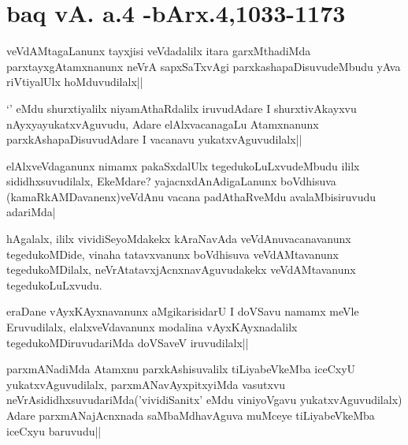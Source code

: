 \section*{baq vA. a.4 -bArx.4,1033-1173}


\begin{artha}
veVdAMtagaLanunx tayxjisi veVdadalilx itara garxMthadiMda parxtayxgAtamxnanunx neVrA 
sapxSaTxvAgi parxkashapaDisuvudeMbudu yAva riVtiyalUlx hoMduvudilalx||
\end{artha}

\begin{artha}
`\stext' eMdu shurxtiyalilx niyamAthaRdalilx iruvudAdare I shurxtivAkayxvu 
nAyxyayukatxvAguvudu, Adare elAlxvacanagaLu Atamxnanunx parxkAshapaDisuvudAdare I vacanavu 
yukatxvAguvudilalx||
\end{artha}


\begin{artha}
elAlxveVdaganunx nimamx pakaSxdalUlx tegedukoLuLxvudeMbudu ililx sididhxsuvudilalx, 
EkeMdare? yajacnxdAnAdigaLanunx boVdhisuva (kamaRkAMDavanenx)veVdAnu vacana padAthaRveMdu 
avalaMbisiruvudu adariMda|
\end{artha}


\begin{artha}
hAgalalx, ililx vividiSeyoMdakekx kAraNavAda veVdAnuvacanavanunx tegedukoMDide, vinaha 
tatavxvanunx boVdhisuva veVdAMtavanunx tegedukoMDilalx, neVrAtatavxjAcnxnavAguvudakekx 
veVdAMtavanunx tegedukoLuLxvudu.
\end{artha}

\begin{artha}
eraDane vAyxKAyxnavanunx aMgikarisidarU I doVSavu namamx meVle Eruvudilalx, 
elalxveVdavanunx modalina vAyxKAyxnadalilx tegedukoMDiruvudariMda doVSaveV iruvudilalx||
\end{artha}


\begin{artha}
parxmANadiMda Atamxnu parxkAshisuvalilx tiLiyabeVkeMba iceCxyU yukatxvAguvudilalx, 
parxmANavAyxpitxyiMda vasutxvu neVrAsididhxsuvudariMda('vividiSanitx' eMdu viniyoVgavu 
yukatxvAguvudilalx) Adare parxmANajAcnxnada saMbaMdhavAguva muMceye tiLiyabeVkeMba iceCxyu 
baruvudu||
\end{artha}

